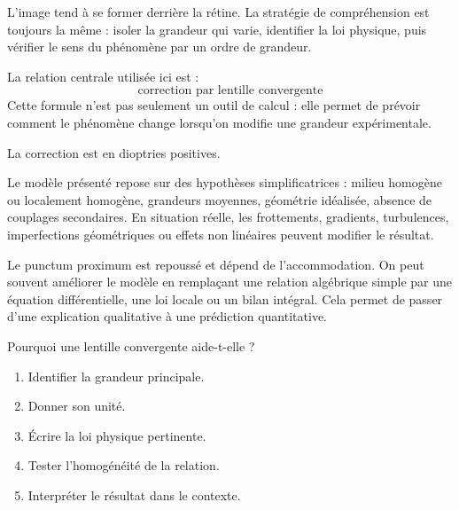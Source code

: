 \documentclass[11pt,a4paper]{article}
\begin{document}
\begin{methodebox}
L'image tend à se former derrière la rétine.
La stratégie de compréhension est toujours la même : isoler la grandeur qui varie, identifier la loi physique, puis vérifier le sens du phénomène par un ordre de grandeur.
\end{methodebox}

\begin{theorembox}
La relation centrale utilisée ici est :
\[
\text{correction par lentille convergente}
\]
Cette formule n'est pas seulement un outil de calcul : elle permet de prévoir comment le phénomène change lorsqu'on modifie une grandeur expérimentale.
\end{theorembox}

\begin{odgbox}
La correction est en dioptries positives.
\end{odgbox}

\begin{attentionbox}
Le modèle présenté repose sur des hypothèses simplificatrices : milieu homogène ou localement homogène, grandeurs moyennes, géométrie idéalisée, absence de couplages secondaires. En situation réelle, les frottements, gradients, turbulences, imperfections géométriques ou effets non linéaires peuvent modifier le résultat.
\end{attentionbox}

\begin{approfondissementbox}
Le punctum proximum est repoussé et dépend de l'accommodation.
On peut souvent améliorer le modèle en remplaçant une relation algébrique simple par une équation différentielle, une loi locale ou un bilan intégral. Cela permet de passer d'une explication qualitative à une prédiction quantitative.
\end{approfondissementbox}

\begin{exercicebox}
Pourquoi une lentille convergente aide-t-elle ?
\begin{enumerate}
  \item Identifier la grandeur principale.
  \item Donner son unité.
  \item Écrire la loi physique pertinente.
  \item Tester l'homogénéité de la relation.
  \item Interpréter le résultat dans le contexte.
\end{enumerate}
\end{exercicebox}
\end{document}
